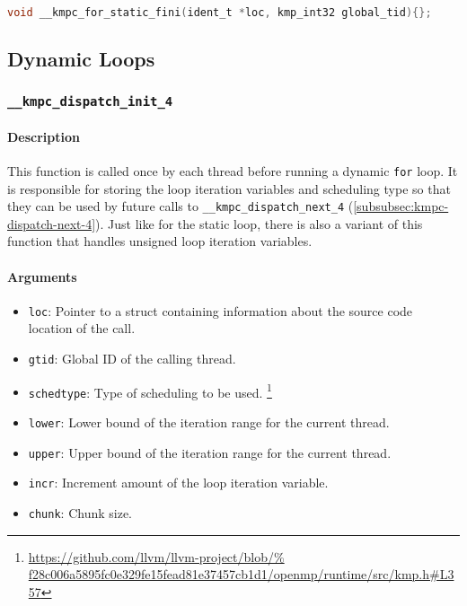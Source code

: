 \begin{lstlisting}[language=C, caption={\_\_kmpc\_for\_static\_fini}, label={lst:for-static-fini},
                   escapechar=@]
void __kmpc_for_static_fini(ident_t *loc, kmp_int32 global_tid){};
\end{lstlisting}

\subsection{Dynamic Loops}

\subsubsection{\texttt{__kmpc_dispatch_init_4}}

\paragraph{Description} This function is called once by each thread before running a dynamic
\texttt{for} loop. It is responsible for storing the loop iteration variables and scheduling type so
that they can be used by future calls to \texttt{__kmpc_dispatch_next_4}
(\cref{subsubsec:kmpc-dispatch-next-4}). Just like for the static loop, there is also a variant of
this function that handles unsigned loop iteration variables.

\paragraph{Arguments}
\begin{itemize}
	\item \texttt{loc}: Pointer to a struct containing information about the source code location
	      of the call.
	\item \texttt{gtid}: Global ID of the calling thread.
	\item \texttt{schedtype}: Type of scheduling to be used.
	      \footnote{\url{
			      https://github.com/llvm/llvm-project/blob/%
			      f28c006a5895fc0e329fe15fead81e37457cb1d1/openmp/runtime/src/kmp.h\#L357}}
	\item \texttt{lower}: Lower bound of the iteration range for the current thread.
	\item \texttt{upper}: Upper bound of the iteration range for the current thread.
	\item \texttt{incr}: Increment amount of the loop iteration variable.
	\item \texttt{chunk}: Chunk size.
\end{itemize}

